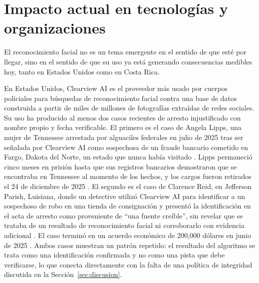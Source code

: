%
\section{Impacto actual en tecnologías y organizaciones}
\label{sec:impacto}

El reconocimiento facial no es un tema emergente en el sentido de que
esté por llegar, sino en el sentido de que su uso ya está generando
consecuencias medibles hoy, tanto en Estados Unidos como en Costa
Rica.

En Estados Unidos, Clearview AI es el proveedor más usado por
cuerpos policiales para búsquedas de reconocimiento facial contra una
base de datos construida a partir de miles de millones de fotografías
extraídas de redes sociales. Su uso ha producido al menos dos casos
recientes de arresto injustificado con nombre propio y fecha
verificable. El primero es el caso de Angela Lipps, una mujer
de Tennessee arrestada por alguaciles federales en julio de 2025 tras
ser señalada por Clearview AI como sospechosa de un fraude bancario
cometido en Fargo, Dakota del Norte, un estado que nunca había
visitado \cite{cnn_lipps_2026}. Lipps permaneció cinco meses en
prisión hasta que sus registros bancarios demostraron que se
encontraba en Tennessee al momento de los hechos, y los cargos fueron
retirados el 24 de diciembre de 2025 \cite{cnn_lipps_2026}. El segundo
es el caso de Clarence Reid, en Jefferson Parish, Luisiana,
donde un detective utilizó Clearview AI para identificar a un
sospechoso de robo en una tienda de consignación y presentó la
identificación en el acta de arresto como proveniente de ``una fuente
creíble'', sin revelar que se trataba de un resultado de
reconocimiento facial ni corroborarlo con evidencia adicional
\cite{biometricupdate_reid_2025}. El caso terminó en un acuerdo
económico de 200{,}000 dólares en junio de 2025
\cite{biometricupdate_reid_2025}. Ambos casos muestran un patrón
repetido: el resultado del algoritmo se trata como una identificación
confirmada y no como una pista que debe verificarse, lo que conecta
directamente con la falta de una política de integridad discutida en
la Sección~\ref{sec:discusion}.

